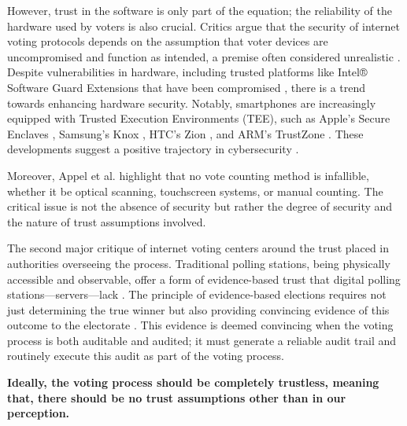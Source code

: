 \documentclass[runningheads]{llncs}
\begin{document}
However, trust in the software is only part of the equation; the reliability of the hardware used by voters is also crucial. Critics argue that the security of internet voting protocols depends on the assumption that voter devices are uncompromised and function as intended, a premise often considered unrealistic \cite{parkGoingBadWorse2021}. Despite vulnerabilities in hardware, including trusted platforms like Intel® Software Guard Extensions \cite{mckeenIntelSoftwareGuard2016} that have been compromised \cite{goodinIntelSGXVulnerable2020, IntelSGXBroken2019, bulckForeshadowExtractingKeys}, there is a trend towards enhancing hardware security. Notably, smartphones are increasingly equipped with Trusted Execution Environments (TEE), such as Apple's Secure Enclaves \cite{SecureEnclave}, Samsung's Knox \cite{kanonovSecureContainersAndroid2016}, HTC's Zion \cite{exodusZION}, and ARM's TrustZone \cite{ARMSecurityTechnology}. These developments suggest a positive trajectory in cybersecurity \cite{golombBelieveItCybersecurity2018}.

Moreover, Appel et al. \cite{appelEvidenceBasedElectionsCreate2019} highlight that no vote counting method is infallible, whether it be optical scanning, touchscreen systems, or manual counting. The critical issue is not the absence of security but rather the degree of security and the nature of trust assumptions involved.

The second major critique of internet voting centers around the trust placed in authorities overseeing the process. Traditional polling stations, being physically accessible and observable, offer a form of evidence-based trust that digital polling stations—servers—lack \cite{starkEvidenceBasedElections2012}. The principle of evidence-based elections requires not just determining the true winner but also providing convincing evidence of this outcome to the electorate \cite{appelEvidenceBasedElectionsCreate2019}. This evidence is deemed convincing when the voting process is both auditable and audited; it must generate a reliable audit trail and routinely execute this audit as part of the voting process.

\textbf{Ideally, the voting process should be completely trustless, meaning that, there should be no trust assumptions other than in our perception.}
\end{document}
